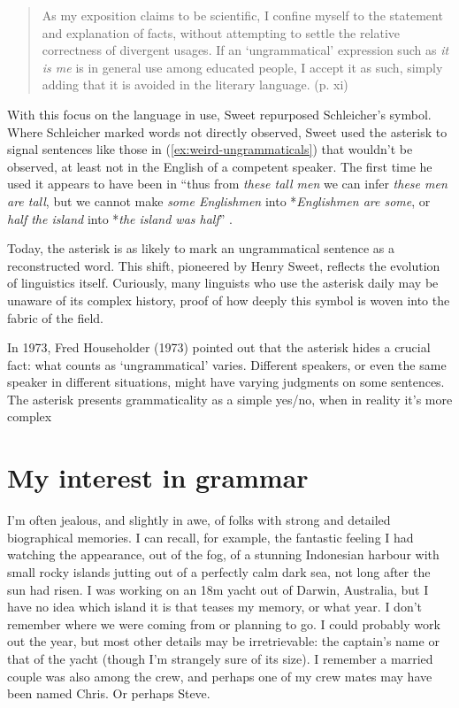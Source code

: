 \begin{quote}
    As my exposition claims to be scientific, I confine myself
to the statement and explanation of facts, without attempting
to settle the relative correctness of divergent usages. If an
`ungrammatical' expression such as \textit{it is me} is in general
use among educated people, I accept it as such, simply
adding that it is avoided in the literary language. \phantom{~ }\hfill(p. xi)
\end{quote}

With this focus on the language in use, Sweet repurposed Schleicher's symbol. Where Schleicher marked words not directly observed, Sweet used the asterisk to signal sentences like those in (\ref{ex:weird-ungrammaticals}) that wouldn't be observed, at least not in the English of a competent speaker. The first time he used it appears to have been in ``thus from \textit{these tall men} we can infer \textit{these men are tall}, but we cannot make \textit{some Englishmen} into *\textit{Englishmen are some}, or \textit{half the island} into *\textit{the island was half}'' \citep[14]{Sweet}.

Today, the asterisk is as likely to mark an ungrammatical sentence as a reconstructed word. This shift, pioneered by Henry Sweet, reflects the evolution of linguistics itself. Curiously, many linguists who use the asterisk daily may be unaware of its complex history, proof of how deeply this symbol is woven into the fabric of the field.

\bigskip

In 1973, Fred Householder (1973) pointed out that the asterisk hides a crucial fact: what counts as `ungrammatical' varies. Different speakers, or even the same speaker in different situations, might have varying judgments on some sentences. The asterisk presents grammaticality as a simple yes/no, when in reality it's more complex

\section{My interest in grammar}
I'm often jealous, and slightly in awe, of folks with strong and detailed biographical memories. I can recall, for example, the fantastic feeling I had watching the appearance, out of the fog, of a stunning Indonesian harbour with small rocky islands jutting out of a perfectly calm dark sea, not long after the sun had risen. I was working on an 18m yacht out of Darwin, Australia, but I have no idea which island it is that teases my memory, or what year. I don't remember where we were coming from or planning to go. I could probably work out the year, but most other details may be irretrievable: the captain's name or that of the yacht (though I'm strangely sure of its size). I remember a married couple was also among the crew, and perhaps one of my crew mates may have been named Chris. Or perhaps Steve.

